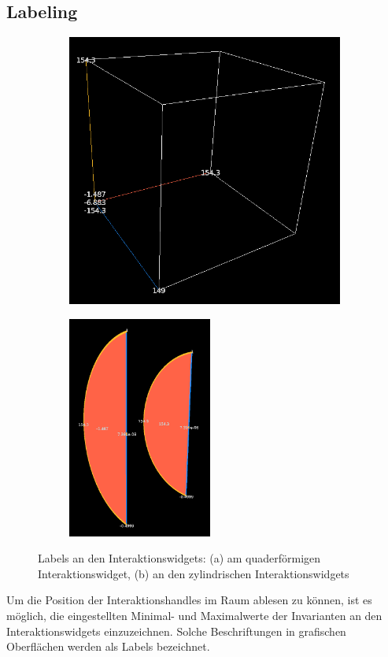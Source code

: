 \documentclass[a4paper,fontsize=12pt,toc=bib,parskip=half,ngerman]{scrartcl}
\begin{document}
\subsection{Labeling}
\begin{figure}
	\centering
	\begin{subfigure}{0.6\textwidth}
		\centering
		\includegraphics[height=7.cm]{pictures/QuadricLabels.png}
		\subcaption{}
		\label{QuadricLabels}
	\end{subfigure}
	\begin{subfigure}{0.3\textwidth}
		\centering
		\includegraphics[height=7.3cm]{pictures/CylindricalLabels.png}
		\subcaption{}
		\label{CylindricalLabels}
	\end{subfigure}
	\caption{Labels an den Interaktionswidgets: (a) am quaderf\"ormigen Interaktionswidget, (b) an den zylindrischen Interaktionswidgets}
\end{figure}
Um die Position der Interaktionshandles im Raum ablesen zu k\"onnen, ist es m\"oglich, die eingestellten Minimal- und Maximalwerte der Invarianten an den Interaktionswidgets einzuzeichnen. Solche Beschriftungen in grafischen Oberfl\"achen werden als \glq Labels\grq{} bezeichnet.
\end{document}
